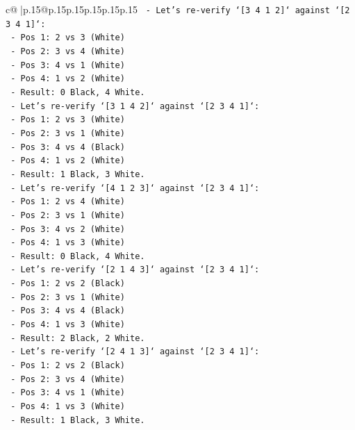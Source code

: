 \documentclass{article}
\begin{document}
{\begin{supertabular}{c@{$\;$}|p{.15\linewidth}@{}p{.15\linewidth}p{.15\linewidth}p{.15\linewidth}p{.15\linewidth}p{.15\linewidth}}
{{{\texttt{  {-} Let's re{-}verify `{[}3 4 1 2{]}` against `{[}2 3 4 1{]}`:} \\
\texttt{    {-} Pos 1: 2 vs 3 (White)} \\
\texttt{    {-} Pos 2: 3 vs 4 (White)} \\
\texttt{    {-} Pos 3: 4 vs 1 (White)} \\
\texttt{    {-} Pos 4: 1 vs 2 (White)} \\
\texttt{    {-} Result: 0 Black, 4 White.} \\
\texttt{  {-} Let's re{-}verify `{[}3 1 4 2{]}` against `{[}2 3 4 1{]}`:} \\
\texttt{    {-} Pos 1: 2 vs 3 (White)} \\
\texttt{    {-} Pos 2: 3 vs 1 (White)} \\
\texttt{    {-} Pos 3: 4 vs 4 (Black)} \\
\texttt{    {-} Pos 4: 1 vs 2 (White)} \\
\texttt{    {-} Result: 1 Black, 3 White.} \\
\texttt{  {-} Let's re{-}verify `{[}4 1 2 3{]}` against `{[}2 3 4 1{]}`:} \\
\texttt{    {-} Pos 1: 2 vs 4 (White)} \\
\texttt{    {-} Pos 2: 3 vs 1 (White)} \\
\texttt{    {-} Pos 3: 4 vs 2 (White)} \\
\texttt{    {-} Pos 4: 1 vs 3 (White)} \\
\texttt{    {-} Result: 0 Black, 4 White.} \\
\texttt{  {-} Let's re{-}verify `{[}2 1 4 3{]}` against `{[}2 3 4 1{]}`:} \\
\texttt{    {-} Pos 1: 2 vs 2 (Black)} \\
\texttt{    {-} Pos 2: 3 vs 1 (White)} \\
\texttt{    {-} Pos 3: 4 vs 4 (Black)} \\
\texttt{    {-} Pos 4: 1 vs 3 (White)} \\
\texttt{    {-} Result: 2 Black, 2 White.} \\
\texttt{  {-} Let's re{-}verify `{[}2 4 1 3{]}` against `{[}2 3 4 1{]}`:} \\
\texttt{    {-} Pos 1: 2 vs 2 (Black)} \\
\texttt{    {-} Pos 2: 3 vs 4 (White)} \\
\texttt{    {-} Pos 3: 4 vs 1 (White)} \\
\texttt{    {-} Pos 4: 1 vs 3 (White)} \\
\texttt{    {-} Result: 1 Black, 3 White.} \\
}}}
\end{supertabular}}
\end{document}
